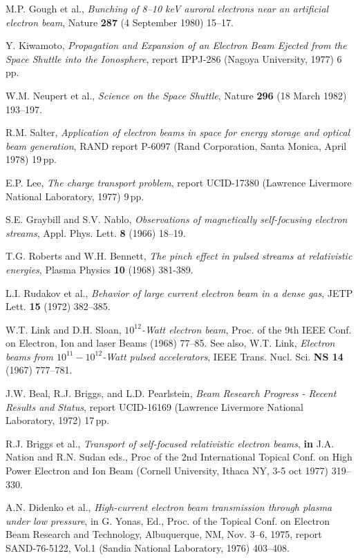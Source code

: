 \documentclass [12pt,a4paper,     ]{report} %
\begin{document}
\begin{enumerate}
  M.P. Gough et al., \emph{Bunching of 8--10 keV auroral electrons near an artificial electron beam}, Nature {\bf 287} (4 September 1980) 15--17.

 Y. Kiwamoto, \emph{Propagation and Expansion of an Electron Beam Ejected from the Space Shuttle into the Ionosphere}, report IPPJ-286 (Nagoya University, 1977) 6\,pp.

 W.M. Neupert et al., \emph{Science on the Space Shuttle}, Nature {\bf 296} (18 March 1982) 193--197.

 R.M. Salter, \emph{Application of electron beams in space for energy storage and optical beam generation}, RAND report P-6097 (Rand Corporation, Santa Monica, April 1978) 19\,pp.

 E.P. Lee, \emph{The charge transport problem}, report UCID-17380 (Lawrence Livermore National Laboratory, 1977) 9\,pp.

 S.E. Graybill and S.V. Nablo, \emph{Observations of magnetically self-focusing electron streams}, Appl. Phys. Lett. {\bf 8} (1966) 18--19.

 T.G. Roberts and W.H. Bennett, \emph{The pinch effect in pulsed streams at relativistic energies}, Plasma Physics {\bf 10} (1968) 381-389.

 L.I. Rudakov et al., \emph{Behavior of large current electron beam in a dense gas}, JETP Lett. {\bf 15} (1972) 382--385.

 W.T. Link and D.H. Sloan, \emph{$10^{12}$-Watt electron beam}, Proc. of the 9th IEEE Conf. on Electron, Ion and laser Beams (1968) 77--85.  See also, W.T. Link, \emph{Electron beams from $10^{11}-10^{12}$-Watt pulsed accelerators}, IEEE Trans. Nucl. Sci. {\bf NS 14} (1967) 777--781.

 J.W. Beal, R.J. Briggs, and L.D. Pearlstein, \emph{Beam Research Progress - Recent Results and Status}, report UCID-16169 (Lawrence Livermore National Laboratory, 1972) 17\,pp.

 R.J. Briggs et al., \emph{Transport of self-focused relativistic electron beams}, {\bf in} J.A. Nation and R.N. Sudan eds., Proc of the 2nd International Topical Conf. on High Power Electron and Ion Beam (Cornell University, Ithaca NY, 3-5 oct 1977) 319--330.

 A.N. Didenko et al., \emph{High-current electron beam transmission through plasma under low pressure}, {\bf} in G. Yonas, Ed., Proc. of the Topical Conf. on Electron Beam Research and Technology, Albuquerque, NM, Nov. 3--6, 1975, report SAND-76-5122, Vol.1 (Sandia National Laboratory, 1976) 403--408.


\end{enumerate}
\end{document}
